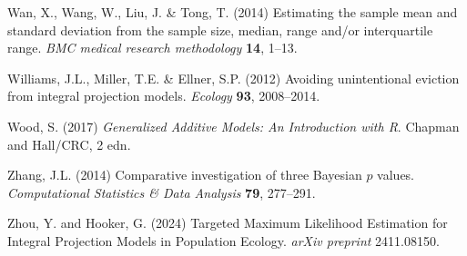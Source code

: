 \documentclass[12pt]{article}
\begin{document}
\begin{spacing}{1.9}
\begin{thebibliography}{62}
Wan, X., Wang, W., Liu, J. \& Tong, T. (2014) Estimating the sample mean and
  standard deviation from the sample size, median, range and/or interquartile
  range. \emph{BMC medical research methodology} \textbf{14}, 1--13.

Williams, J.L., Miller, T.E. \& Ellner, S.P. (2012) Avoiding unintentional
  eviction from integral projection models. \emph{Ecology} \textbf{93},
  2008--2014.
    
Wood, S. (2017) \emph{Generalized Additive Models: An Introduction with R}.
  Chapman and Hall/CRC, 2 edn.

Zhang, J.L. (2014) Comparative investigation of three {B}ayesian $p$ values.
  \emph{Computational Statistics \& Data Analysis} \textbf{79}, 277--291.

Zhou, Y. and Hooker, G. (2024) Targeted Maximum Likelihood Estimation for Integral Projection Models in Population Ecology.
\emph{arXiv preprint} 2411.08150.
  
\end{thebibliography}










\end{spacing}
\end{document}
